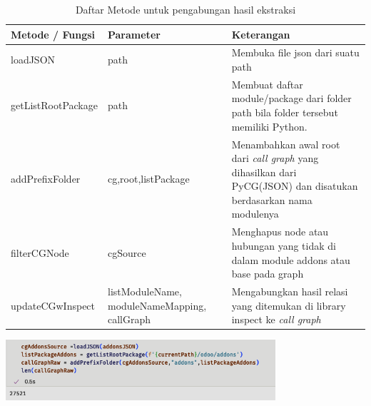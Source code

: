 \begingroup
\setlength{\LTleft}{-20cm plus -1fill}
\setlength{\LTright}{\LTleft}
\begin{small}
	\begin{longtable}{|p{4cm}|p{3cm}|p{6cm}|}
		\caption{Daftar Metode untuk pengabungan hasil ekstraksi}\\
		\hline
		\textbf{Metode / Fungsi} & \textbf{Parameter} & \textbf{Keterangan}\\
		\endfirsthead
		
		\hline  

		loadJSON
		& path
		 & Membuka file json dari suatu path  \\

		 \hline  

		 getListRootPackage
		& path
		 & Membuat daftar module/package dari folder path bila folder tersebut memiliki Python. \\

		 \hline  

		 addPrefixFolder
		& cg,root,listPackage
		 & Menambahkan awal root dari \textit{call graph} yang dihasilkan dari PyCG(JSON) dan disatukan berdasarkan nama modulenya  \\
		 
		 \hline  




		 filterCGNode
		& cgSource
		 & Menghapus node atau hubungan yang tidak di dalam module addons atau base pada graph \\

		 \hline
		
		 updateCGwInspect
		& listModuleName, moduleNameMapping, callGraph
		 & Mengabungkan hasil relasi yang ditemukan di library inspect ke \textit{call graph}  \\

		 \hline
	\end{longtable}
\end{small}
\endgroup

\begin{center}
	\includegraphics[width=10cm]{img/bab_4/ekstraksi_1.png}
	\label{fig:ekstraksi_1}
\end{center}

